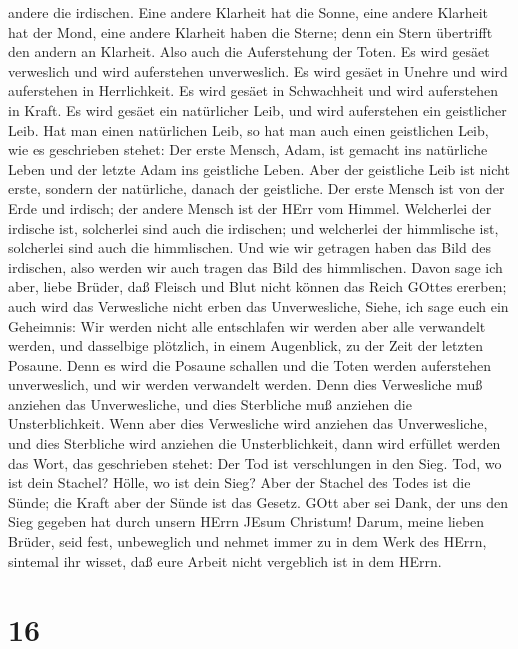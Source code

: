 andere die irdischen.  Eine andere Klarheit hat die Sonne,
eine andere Klarheit hat der Mond, eine andere Klarheit haben die
Sterne; denn ein Stern übertrifft den andern an Klarheit. 
Also auch die Auferstehung der Toten. Es wird gesäet verweslich und wird
auferstehen unverweslich.  Es wird gesäet in Unehre und
wird auferstehen in Herrlichkeit. Es wird gesäet in Schwachheit und wird
auferstehen in Kraft.  Es wird gesäet ein natürlicher Leib,
und wird auferstehen ein geistlicher Leib. Hat man einen natürlichen
Leib, so hat man auch einen geistlichen Leib,  wie es
geschrieben stehet: Der erste Mensch, Adam, ist gemacht ins natürliche
Leben und der letzte Adam ins geistliche Leben.  Aber der
geistliche Leib ist nicht erste, sondern der natürliche, danach der
geistliche.  Der erste Mensch ist von der Erde und irdisch;
der andere Mensch ist der HErr vom Himmel.  Welcherlei der
irdische ist, solcherlei sind auch die irdischen; und welcherlei der
himmlische ist, solcherlei sind auch die himmlischen.  Und
wie wir getragen haben das Bild des irdischen, also werden wir auch
tragen das Bild des himmlischen.  Davon sage ich aber,
liebe Brüder, daß Fleisch und Blut nicht können das Reich GOttes
ererben; auch wird das Verwesliche nicht erben das Unverwesliche,
 Siehe, ich sage euch ein Geheimnis: Wir werden nicht alle
entschlafen wir werden aber alle verwandelt werden,  und
dasselbige plötzlich, in einem Augenblick, zu der Zeit der letzten
Posaune. Denn es wird die Posaune schallen und die Toten werden
auferstehen unverweslich, und wir werden verwandelt werden.
 Denn dies Verwesliche muß anziehen das Unverwesliche, und
dies Sterbliche muß anziehen die Unsterblichkeit.  Wenn
aber dies Verwesliche wird anziehen das Unverwesliche, und dies
Sterbliche wird anziehen die Unsterblichkeit, dann wird erfüllet werden
das Wort, das geschrieben stehet:  Der Tod ist verschlungen
in den Sieg. Tod, wo ist dein Stachel? Hölle, wo ist dein Sieg?
 Aber der Stachel des Todes ist die Sünde; die Kraft aber
der Sünde ist das Gesetz.  GOtt aber sei Dank, der uns den
Sieg gegeben hat durch unsern HErrn JEsum Christum!  Darum,
meine lieben Brüder, seid fest, unbeweglich und nehmet immer zu in dem
Werk des HErrn, sintemal ihr wisset, daß eure Arbeit nicht vergeblich
ist in dem HErrn.

\hypertarget{section-15}{%
\section{16}\label{section-15}}

